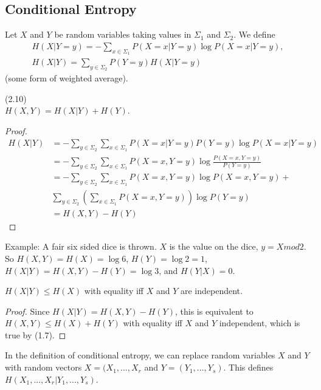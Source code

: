 \documentclass[a4paper]{article}
\begin{document}
\subsection{Conditional Entropy}

Let $X$ and $Y$ be random variables taking values in $\Sigma_1$ and $\Sigma_2$. We define
\begin{equation*}
\begin{aligned}
H(X | Y=y) = -\sum_{x \in \Sigma_1} P(X=x|Y=y) \log P(X=x|Y=y),\\
H(X|Y) = \sum_{y \in \Sigma_2} P(Y=y)H(X|Y=y)
\end{aligned}
\end{equation*}
(some form of weighted average).

\begin{lemma} (2.10)\\
$H(X,Y) = H(X|Y) + H(Y)$.
\begin{proof}
\begin{equation*}
\begin{aligned}
H(X|Y) &= -\sum_{y \in \Sigma_2} \sum_{x \in \Sigma_1} P(X=x|Y=y) P(Y=y) \log P(X=x|Y=y)\\
&= -\sum_{y \in \Sigma_2} \sum_{x \in \Sigma_1} P(X=x,Y=y) \log \frac{P(X=x,Y=y)}{P(Y=y)}\\
&= -\sum_{y \in \Sigma_2} \sum_{x \in \Sigma_1} P(X=x,Y=y) \log P(X=x,Y=y) +\\
&\sum_{y \in \Sigma_2} (\sum_{x \in \Sigma_1} P(X=x,Y=y) ) \log P(Y=y)\\
&= H(X,Y) - H(Y)
\end{aligned}
\end{equation*}
\end{proof}
\end{lemma}

Example: A fair six sided dice is thrown. $X$ is the value on the dice, $y=X mod 2$. So $H(X,Y) = H(X) =\log 6$, $H(Y) = \log 2 = 1$, $H(X|Y) = H(X,Y)-H(Y)= \log 3$, and $H(Y|X) = 0$.

\begin{coro}
$H(X|Y) \leq H(X)$ with equality iff $X$ and $Y$ are independent.
\begin{proof}
Since $H(X|Y) = H(X,Y) - H(Y)$, this is equivalent to $H(X,Y) \leq H(X)+H(Y)$ with equality iff $X$ and $Y$ independent, which is true by (1.7).
\end{proof}
\end{coro}

In the definition of conditional entropy, we can replace random variables $X$ and $Y$ with random vectors $X=(X_1,...,X_r$ and $Y=(Y_1,...,Y_s)$. This defines $H(X_1,...,X_r| Y_1,...,Y_s)$.
\end{document}
